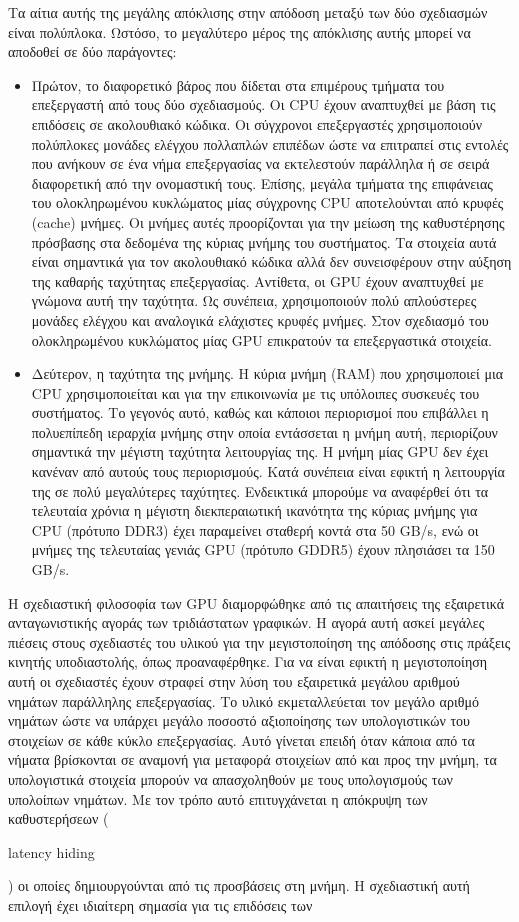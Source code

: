 Τα αίτια αυτής της μεγάλης απόκλισης στην απόδοση μεταξύ των δύο σχεδιασμών είναι πολύπλοκα. Ωστόσο, το μεγαλύτερο μέρος της απόκλισης αυτής μπορεί να αποδοθεί σε δύο παράγοντες:
\begin{itemize}
\item Πρώτον, το διαφορετικό βάρος που δίδεται στα επιμέρους τμήματα του επεξεργαστή από τους δύο σχεδιασμούς. Οι CPU έχουν αναπτυχθεί με βάση τις επιδόσεις σε ακολουθιακό κώδικα. Οι σύγχρονοι επεξεργαστές χρησιμοποιούν πολύπλοκες μονάδες ελέγχου πολλαπλών επιπέδων ώστε να επιτραπεί στις εντολές που ανήκουν σε ένα νήμα επεξεργασίας να εκτελεστούν παράλληλα ή σε σειρά διαφορετική από την ονομαστική τους. Επίσης, μεγάλα τμήματα της επιφάνειας του ολοκληρωμένου κυκλώματος μίας σύγχρονης CPU αποτελούνται από κρυφές (cache) μνήμες. Οι μνήμες αυτές προορίζονται για την μείωση της καθυστέρησης πρόσβασης στα δεδομένα της κύριας μνήμης του συστήματος. Τα στοιχεία αυτά είναι σημαντικά για τον ακολουθιακό κώδικα αλλά δεν συνεισφέρουν στην αύξηση της καθαρής ταχύτητας επεξεργασίας. Αντίθετα, οι GPU έχουν αναπτυχθεί με γνώμονα αυτή την ταχύτητα. Ως συνέπεια, χρησιμοποιούν πολύ απλούστερες μονάδες ελέγχου  και αναλογικά ελάχιστες κρυφές μνήμες. Στον σχεδιασμό του ολοκληρωμένου κυκλώματος μίας GPU επικρατούν τα 
επεξεργαστικά στοιχεία. 
\item Δεύτερον, η ταχύτητα της μνήμης. Η κύρια μνήμη (RAM) που χρησιμοποιεί μια CPU χρησιμοποιείται και για την επικοινωνία με τις υπόλοιπες συσκευές του συστήματος. Το γεγονός αυτό, καθώς και κάποιοι περιορισμοί που επιβάλλει η πολυεπίπεδη ιεραρχία μνήμης στην οποία εντάσσεται η μνήμη αυτή, περιορίζουν σημαντικά την μέγιστη ταχύτητα λειτουργίας της. Η μνήμη μίας GPU δεν έχει κανέναν από αυτούς τους περιορισμούς. Κατά συνέπεια είναι εφικτή η λειτουργία της σε πολύ μεγαλύτερες ταχύτητες. Ενδεικτικά μπορούμε να αναφέρθεί ότι τα τελευταία χρόνια η μέγιστη διεκπεραιωτική ικανότητα της κύριας μνήμης για CPU (πρότυπο DDR3) έχει παραμείνει σταθερή κοντά στα 50 GB/s, ενώ οι μνήμες της τελευταίας γενιάς GPU (πρότυπο GDDR5) έχουν πλησιάσει τα 150 GB/s.
\end{itemize}
Η σχεδιαστική φιλοσοφία των GPU διαμορφώθηκε από τις απαιτήσεις της εξαιρετικά ανταγωνιστικής αγοράς των τριδιάστατων γραφικών. Η αγορά αυτή ασκεί μεγάλες πιέσεις στους σχεδιαστές του υλικού για την μεγιστοποίηση της απόδοσης στις πράξεις κινητής υποδιαστολής, όπως προαναφέρθηκε. Για να είναι εφικτή η μεγιστοποίηση αυτή οι σχεδιαστές  έχουν στραφεί στην λύση του εξαιρετικά μεγάλου αριθμού νημάτων παράλληλης επεξεργασίας. Το υλικό εκμεταλλεύεται τον μεγάλο αριθμό νημάτων ώστε να υπάρχει μεγάλο ποσοστό αξιοποίησης των υπολογιστικών του στοιχείων σε κάθε κύκλο επεξεργασίας. Αυτό γίνεται επειδή όταν κάποια από τα νήματα βρίσκονται σε αναμονή για μεταφορά στοιχείων από και προς την μνήμη, τα υπολογιστικά στοιχεία μπορούν να απασχοληθούν με τους υπολογισμούς των υπολοίπων νημάτων. Με τον τρόπο αυτό επιτυγχάνεται η απόκρυψη των καθυστερήσεων (\begin{english}latency hiding\end{english}) οι οποίες δημιουργούνται από τις προσβάσεις στη μνήμη. Η σχεδιαστική αυτή επιλογή έχει ιδιαίτερη σημασία για τις επιδόσεις των 
